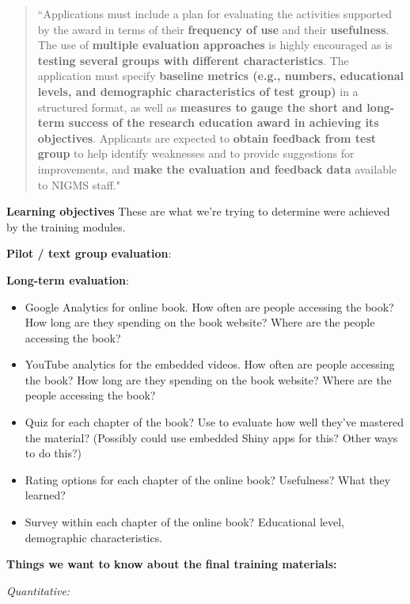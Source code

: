 \documentclass[pdftex,english,11pt,parskip=half]{scrartcl}
\begin{document}
\begin{quotation} ``Applications must include a plan for evaluating the
activities supported by the award in terms of their \textbf{frequency of use}
and their \textbf{usefulness}. The use of \textbf{multiple evaluation
approaches} is highly encouraged as is \textbf{testing several groups with
different characteristics}. The application must specify \textbf{baseline
metrics (e.g., numbers, educational levels, and demographic characteristics of
test group)} in a structured format, as well as \textbf{measures to gauge the
short and long-term success of the research education award in achieving its
objectives}. Applicants are expected to \textbf{obtain feedback from test group}
to help identify weaknesses and to provide suggestions for improvements, and
\textbf{make the evaluation and feedback data} available to NIGMS staff."
\end{quotation}



\textbf{Learning objectives} These are what we're trying to determine were achieved by the training modules.

\textbf{Pilot / text group evaluation}:

\textbf{Long-term evaluation}:

\begin{itemize}
\item Google Analytics for online book. How often are people accessing the book? How long are they spending on the book website? Where are the people accessing the book?
\item YouTube analytics for the embedded videos. How often are people accessing the book? How long are they spending on the book website? Where are the people accessing the book?
\item Quiz for each chapter of the book? Use to evaluate how well they've mastered the material? (Possibly could use embedded Shiny apps for this? Other ways to do this?)
\item Rating options for each chapter of the online book? Usefulness? What they learned?
\item Survey within each chapter of the online book? Educational level, demographic characteristics.
\end{itemize}

\textbf{Things we want to know about the final training materials:}

\textit{Quantitative:}
\end{document}

